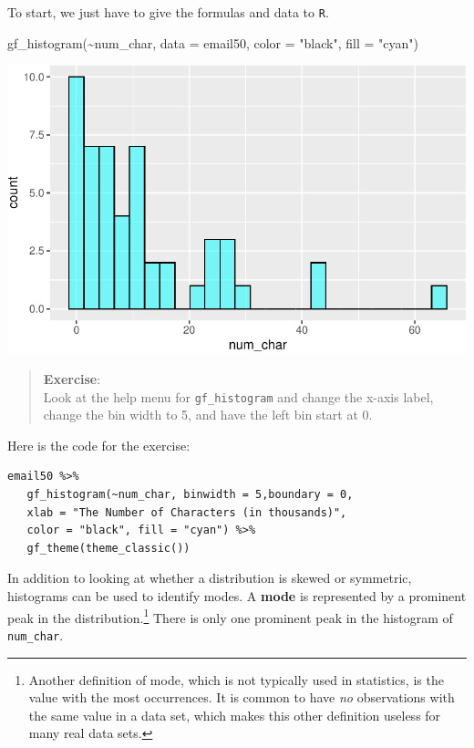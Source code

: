 \documentclass[
  letterpaper,
  DIV=11,
  numbers=noendperiod]{scrreprt}
\newenvironment{Shaded}{\begin{snugshade}}{\end{snugshade}}
\newcommand{\AttributeTok}[1]{\textcolor[rgb]{0.40,0.45,0.13}{#1}}
\newcommand{\FunctionTok}[1]{\textcolor[rgb]{0.28,0.35,0.67}{#1}}
\newcommand{\NormalTok}[1]{\textcolor[rgb]{0.00,0.23,0.31}{#1}}
\newcommand{\SpecialCharTok}[1]{\textcolor[rgb]{0.37,0.37,0.37}{#1}}
\newcommand{\StringTok}[1]{\textcolor[rgb]{0.13,0.47,0.30}{#1}}
\begin{document}
To start, we just have to give the formulas and data to \texttt{R}.

\begin{Shaded}
\begin{Highlighting}[]
\FunctionTok{gf\_histogram}\NormalTok{(}\SpecialCharTok{\textasciitilde{}}\NormalTok{num\_char, }\AttributeTok{data =}\NormalTok{ email50, }\AttributeTok{color =} \StringTok{"black"}\NormalTok{, }\AttributeTok{fill =} \StringTok{"cyan"}\NormalTok{)}
\end{Highlighting}
\end{Shaded}

\includegraphics{05-Numerical-Data_files/figure-pdf/unnamed-chunk-9-1.pdf}

\begin{quote}
\textbf{Exercise}:\\
Look at the help menu for \texttt{gf\_histogram} and change the x-axis
label, change the bin width to 5, and have the left bin start at 0.
\end{quote}

Here is the code for the exercise:

\begin{verbatim}
email50 %>%
   gf_histogram(~num_char, binwidth = 5,boundary = 0,
   xlab = "The Number of Characters (in thousands)", 
   color = "black", fill = "cyan") %>%
   gf_theme(theme_classic())
\end{verbatim}

In addition to looking at whether a distribution is skewed or symmetric,
histograms can be used to identify modes. A \textbf{mode} is represented
by a prominent peak in the distribution.\footnote{Another definition of
  mode, which is not typically used in statistics, is the value with the
  most occurrences. It is common to have \emph{no} observations with the
  same value in a data set, which makes this other definition useless
  for many real data sets.} There is only one prominent peak in the
histogram of \texttt{num\_char}.
\end{document}
